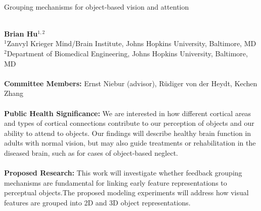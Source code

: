 \documentclass[11pt]{article}
\begin{document}
\ \vspace{20mm}\\

{\LARGE Grouping mechanisms for object-based vision and attention}

\ \\
{\bf \large Brian Hu$^{\displaystyle 1, \displaystyle 2}$}\\
{$^{\displaystyle 1}$Zanvyl Krieger Mind/Brain Institute, Johns Hopkins University, Baltimore, MD}\\
{$^{\displaystyle 2}$Department of Biomedical Engineering, Johns Hopkins University, Baltimore, MD}\\

\ \vspace{20mm}\\

{\bf Committee Members:} Ernst Niebur (advisor), R\"udiger von der Heydt, Kechen Zhang\\

\ \vspace{20mm}\\

{\bf Public Health Significance:} We are interested in how different cortical areas and types of cortical connections contribute to our perception of objects and our ability to attend to objects. Our findings will describe healthy brain function in adults with normal vision, but may also guide treatments or rehabilitation in the diseased brain, such as for cases of object-based neglect.\\

\ \vspace{20mm}\\

{\bf Proposed Research:} This work will investigate whether feedback     grouping mechanisms are fundamental for linking early feature representations to perceptual objects.The proposed modeling experiments will address how visual features are grouped into 2D and 3D object representations.\\

\clearpage

\thispagestyle{empty}

\sloppy %
\end{document}
